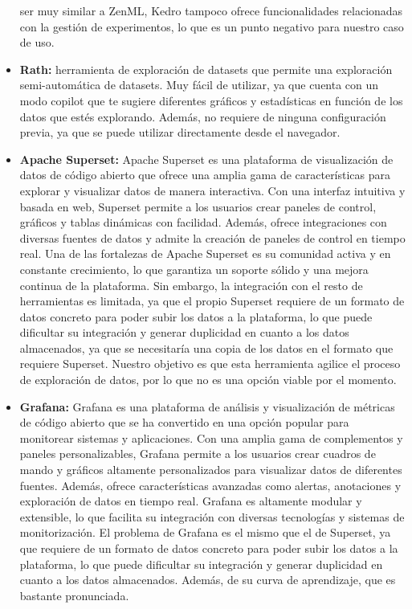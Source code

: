 \begin{itemize}
    ser muy similar a ZenML, Kedro tampoco ofrece funcionalidades relacionadas con la gestión de experimentos,
    lo que es un punto negativo para nuestro caso de uso. 
    \item \textbf{Rath:} herramienta de exploración de datasets que permite una exploración semi-automática
    de datasets. Muy fácil de utilizar, ya que cuenta con un modo copilot que te sugiere diferentes gráficos
    y estadísticas en función de los datos que estés explorando. Además, no requiere de ninguna configuración
    previa, ya que se puede utilizar directamente desde el navegador.
    \item \textbf{Apache Superset:} Apache Superset es una plataforma de visualización de datos de código abierto 
    que ofrece una amplia gama de características para explorar y visualizar datos de manera interactiva. Con una 
    interfaz intuitiva y basada en web, Superset permite a los usuarios crear paneles de control, gráficos y tablas 
    dinámicas con facilidad. Además, ofrece integraciones con diversas fuentes de datos y admite la creación de 
    paneles de control en tiempo real. Una de las fortalezas de Apache Superset es su comunidad activa y en constante 
    crecimiento, lo que garantiza un soporte sólido y una mejora continua de la plataforma. Sin embargo, la integración
    con el resto de herramientas es limitada, ya que el propio Superset requiere de un formato de datos concreto para
    poder subir los datos a la plataforma, lo que puede dificultar su integración y generar duplicidad en cuanto a los
    datos almacenados, ya que se necesitaría una copia de los datos en el formato que requiere Superset. Nuestro objetivo
    es que esta herramienta agilice el proceso de exploración de datos, por lo que no es una opción viable por el momento.
    \item \textbf{Grafana:} Grafana es una plataforma de análisis y visualización de métricas de código abierto que 
    se ha convertido en una opción popular para monitorear sistemas y aplicaciones. Con una amplia gama de complementos 
    y paneles personalizables, Grafana permite a los usuarios crear cuadros de mando y gráficos altamente personalizados 
    para visualizar datos de diferentes fuentes. Además, ofrece características avanzadas como alertas, anotaciones y 
    exploración de datos en tiempo real. Grafana es altamente modular y extensible, lo que facilita su integración con 
    diversas tecnologías y sistemas de monitorización. El problema de Grafana es el mismo que el de Superset, ya que requiere
    de un formato de datos concreto para poder subir los datos a la plataforma, lo que puede dificultar su integración y
    generar duplicidad en cuanto a los datos almacenados. Además, de su curva de aprendizaje, que es bastante pronunciada.
\end{itemize}


